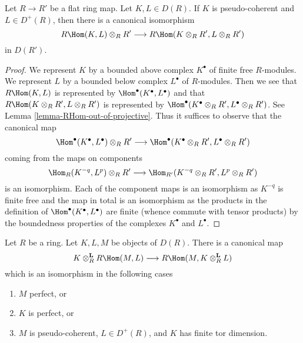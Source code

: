 \begin{lemma}
\label{lemma-base-change-RHom}
Let $R \to R'$ be a flat ring map. Let $K, L \in D(R)$.
If $K$ is pseudo-coherent and $L \in D^{+}(R)$, then
there is a canonical isomorphism
$$
R\Hom(K, L) \otimes_R R'
\longrightarrow
R\Hom(K \otimes_R R', L \otimes_R R')
$$
in $D(R')$.
\end{lemma}

\begin{proof}
We represent $K$ by a bounded above complex $K^\bullet$ of finite
free $R$-modules. We represent $L$ by a bounded below complex $L^\bullet$
of $R$-modules. Then we see that
$R\Hom(K, L)$ is represented by $\Hom^\bullet(K^\bullet, L^\bullet)$
and that
$R\Hom(K \otimes_R R', L \otimes_R R')$
is represented by
$\Hom^\bullet(K^\bullet \otimes_R R', L^\bullet \otimes_R R')$.
See Lemma \ref{lemma-RHom-out-of-projective}.
Thus it suffices to observe that the canonical map
$$
\Hom^\bullet(K^\bullet, L^\bullet) \otimes_R R'
\longrightarrow
\Hom^\bullet(K^\bullet \otimes_R R', L^\bullet \otimes_R R')
$$
coming from the maps on components
$$
\Hom_R(K^{-q}, L^p) \otimes_R R'
\longrightarrow
\Hom_{R'}(K^{-q} \otimes_R R', L^p \otimes_R R')
$$
is an isomorphism. Each of the component maps is an isomorphism
as $K^{-q}$ is finite free and the map in total is an isomorphism
as the products in the definition of $\Hom^\bullet(K^\bullet, L^\bullet)$
are finite (whence commute with tensor products)
by the boundedness properties of the complexes $K^\bullet$
and $L^\bullet$.
\end{proof}

\begin{lemma}
\label{lemma-internal-hom-evaluate-tensor-isomorphism}
Let $R$ be a ring. Let $K, L, M$ be objects of $D(R)$. There is a
canonical map
$$
K \otimes_R^\mathbf{L} R\Hom(M, L) \longrightarrow
R\Hom(M, K \otimes_R^\mathbf{L} L)
$$
which is an isomorphism in the following cases
\begin{enumerate}
\item $M$ perfect, or
\item $K$ is perfect, or
\item $M$ is pseudo-coherent, $L \in D^+(R)$, and $K$ has finite
tor dimension.
\end{enumerate}
\end{lemma}

